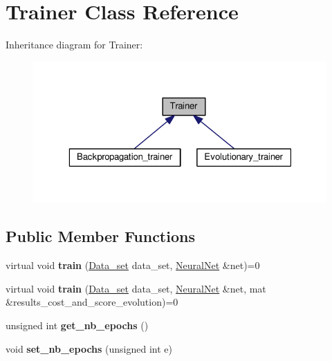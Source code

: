 \hypertarget{classTrainer}{\section{Trainer Class Reference}
\label{classTrainer}
}


Inheritance diagram for Trainer\-:
\nopagebreak
\begin{figure}[H]
\begin{center}
\leavevmode
\includegraphics[width=323pt]{classTrainer__inherit__graph}
\end{center}
\end{figure}
\subsection*{Public Member Functions}
\begin{DoxyCompactItemize}
\item 
\hypertarget{classTrainer_a6e5d64b4e5647dc17d985fddfa96601d}{virtual void {\bfseries train} (\hyperlink{classData__set}{Data\-\_\-set} data\-\_\-set, \hyperlink{classNeuralNet}{Neural\-Net} \&net)=0}\label{classTrainer_a6e5d64b4e5647dc17d985fddfa96601d}

\item 
\hypertarget{classTrainer_a0ca142f63b8891a7fbd43054fbb59606}{virtual void {\bfseries train} (\hyperlink{classData__set}{Data\-\_\-set} data\-\_\-set, \hyperlink{classNeuralNet}{Neural\-Net} \&net, mat \&results\-\_\-cost\-\_\-and\-\_\-score\-\_\-evolution)=0}\label{classTrainer_a0ca142f63b8891a7fbd43054fbb59606}

\item 
\hypertarget{classTrainer_aa8218ae66628883d2125a8d627dbd2e7}{unsigned int {\bfseries get\-\_\-nb\-\_\-epochs} ()}\label{classTrainer_aa8218ae66628883d2125a8d627dbd2e7}

\item 
\hypertarget{classTrainer_a7c7c9b96a6f0cc94ee32f902abe4ec01}{void {\bfseries set\-\_\-nb\-\_\-epochs} (unsigned int e)}\label{classTrainer_a7c7c9b96a6f0cc94ee32f902abe4ec01}

\end{DoxyCompactItemize}
